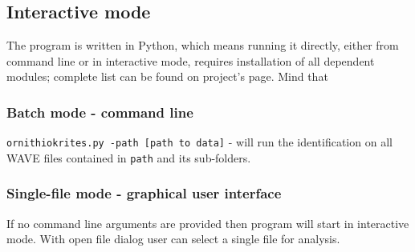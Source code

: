 \documentclass[paper=a4, fontsize=11pt]{scrartcl}	%
\numberwithin{equation}{section}		%
\numberwithin{figure}{section}			%
\numberwithin{table}{section}				%
\begin{document}
\subsection{Interactive mode}
\label{sec:interactive_mode}
The program is written in Python, which means running it directly, either from command line or in interactive mode, requires installation of all dependent modules; complete list can be found on project's page. Mind that 
\subsubsection{Batch mode - command line}
\texttt{ornithiokrites.py -path [path to data]} - will run the identification on all WAVE files contained in \texttt{path} and its sub-folders.
\subsubsection{Single-file mode - graphical user interface}
If no command line arguments are provided then program will start in interactive mode. With open file dialog user can select a single file for analysis.
\end{document}
